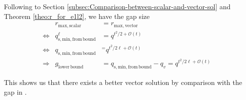 Following to Section \ref{subsec:Comparison-between-scalar-and-vector-sol}
and Theorem \ref{theo:r_for_e1l2}, we have the gap size 
\begin{eqnarray}
 & r_{\mathrm{max,scalar}} & =r_{\mathrm{max,vector}}\nonumber \\
\Leftrightarrow & q_{\mathrm{s,min,from\,bound}}^{\ell} & =q^{t^{2}/2+\mathcal{O}(t)}\nonumber \\
\Leftrightarrow & q_{\mathrm{s,min,from\,bound}} & ^{=}q^{t^{2}/2\ell+\mathcal{O}(t)}\nonumber \\
\Rightarrow & g_{\mathrm{lower\,bound}} & =q_{\mathrm{s,min,from\,bound}}-q_{v}=q^{t^{2}/2\ell+\mathcal{O}(t)}\label{eq:gap_e1l2}
\end{eqnarray}

This shows us that there exists a better vector solution by comparison
with the gap in \cite[Fig. 4]{Wachter-Zeh:2018}.

\clearpage